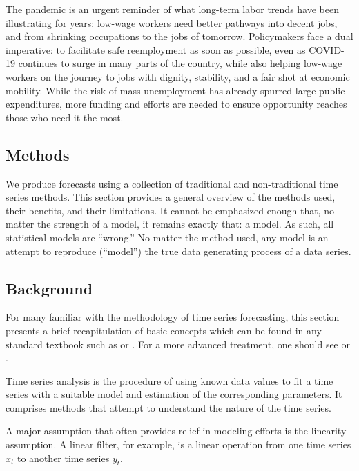 \documentclass[
  11pt,
]{article}
\begin{document}
The pandemic is an urgent reminder of what long-term labor trends have
been illustrating for years: low-wage workers need better pathways into
decent jobs, and from shrinking occupations to the jobs of tomorrow.
Policymakers face a dual imperative: to facilitate safe reemployment as
soon as possible, even as COVID-19 continues to surge in many parts of
the country, while also helping low-wage workers on the journey to jobs
with dignity, stability, and a fair shot at economic mobility. While the
risk of mass unemployment has already spurred large public expenditures,
more funding and efforts are needed to ensure opportunity reaches those
who need it the most.

\hypertarget{methods}{%
\subsection{Methods}\label{methods}}

We produce forecasts using a collection of traditional and
non-traditional time series methods. This section provides a general
overview of the methods used, their benefits, and their limitations. It
cannot be emphasized enough that, no matter the strength of a model, it
remains exactly that: a model. As such, all statistical models are
``wrong.'' No matter the method used, any model is an attempt to
reproduce (``model'') the true data generating process of a data series.

\hypertarget{background}{%
\subsection{Background}\label{background}}

For many familiar with the methodology of time series forecasting, this
section presents a brief recapitulation of basic concepts which can be
found in any standard textbook such as \cite{MJK} or \cite{brockwell02}.
For a more advanced treatment, one should see \cite{hamilton94} or
\cite{brockwell06}.

Time series analysis is the procedure of using known data values to fit
a time series with a suitable model and estimation of the corresponding
parameters. It comprises methods that attempt to understand the nature
of the time series.

A major assumption that often provides relief in modeling efforts is the
linearity assumption. A linear filter, for example, is a linear
operation from one time series \(x_{t}\) to another time series
\(y_{t}\).
\end{document}
